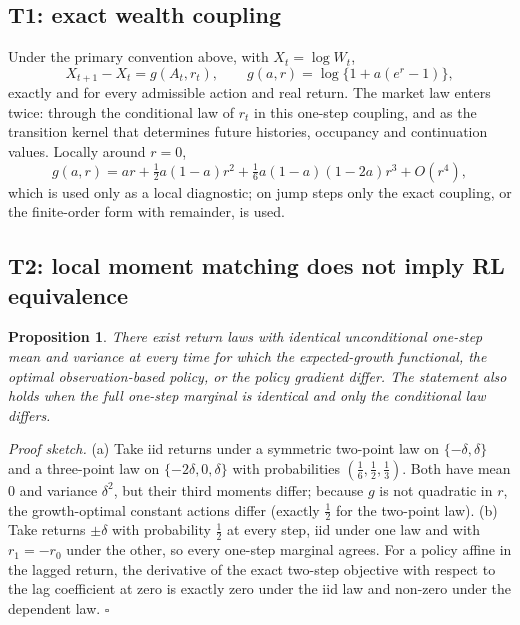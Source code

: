 \documentclass[11pt]{article}
\newtheorem{proposition}{Proposition}
\begin{document}
\subsection*{T1: exact wealth coupling}
Under the primary convention above, with $X_t=\log W_t$,
\[
X_{t+1}-X_t=g(A_t,r_t),\qquad g(a,r)=\log\{1+a(e^{r}-1)\},
\]
exactly and for every admissible action and real return. The market law enters twice: through the conditional law of $r_t$ in this one-step coupling, and as the transition kernel that determines future histories, occupancy and continuation values. Locally around $r=0$,
\[
g(a,r)=ar+\tfrac12a(1-a)r^2+\tfrac16a(1-a)(1-2a)r^3+O(r^4),
\]
which is used only as a local diagnostic; on jump steps only the exact coupling, or the finite-order form with remainder, is used.

\subsection*{T2: local moment matching does not imply RL equivalence}
\begin{proposition}\label{prop:nonequiv}
There exist return laws with identical unconditional one-step mean and variance at every time for which the expected-growth functional, the optimal observation-based policy, or the policy gradient differ. The statement also holds when the full one-step marginal is identical and only the conditional law differs.
\end{proposition}
\emph{Proof sketch.} (a) Take iid returns under a symmetric two-point law on $\{-\delta,\delta\}$ and a three-point law on $\{-2\delta,0,\delta\}$ with probabilities $(\tfrac16,\tfrac12,\tfrac13)$. Both have mean $0$ and variance $\delta^2$, but their third moments differ; because $g$ is not quadratic in $r$, the growth-optimal constant actions differ (exactly $\tfrac12$ for the two-point law). (b) Take returns $\pm\delta$ with probability $\tfrac12$ at every step, iid under one law and with $r_1=-r_0$ under the other, so every one-step marginal agrees. For a policy affine in the lagged return, the derivative of the exact two-step objective with respect to the lag coefficient at zero is exactly zero under the iid law and non-zero under the dependent law. \hfill$\square$
\end{document}
